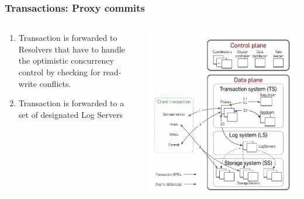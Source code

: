 \begin{frame}
    \frametitle{Transactions: Proxy commits}
    \begin{columns}
        \begin{column}{0.5\textwidth}
            \begin{enumerate}
\item Transaction is forwarded to Resolvers that have to handle the optimistic concurrency control by checking for read-write conflicts.
    \item Transaction is forwarded to a set of designated Log Servers
            \end{enumerate}
        \end{column}
        \begin{column}{0.5\textwidth}
            \centering
            \includegraphics[width=\textwidth]{img/2-Architecture/Architecture and transaction processing.png}
        \end{column}
    \end{columns}
\end{frame}
